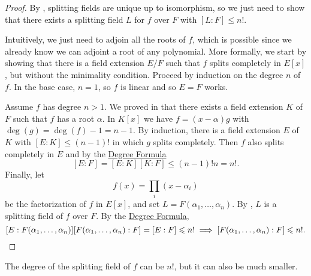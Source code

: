 \documentclass[12pt]{report}
\numberwithin{equation}{section}
\numberwithin{theorem}{chapter}
\theoremstyle{definition}
\newtheorem*{basic properties}{Basic Properties}
\newtheorem*{Important Remark}{Important Remark}
\begin{document}
\begin{proof} 
By , splitting fields are unique up to isomorphism, so we just need to show that there exists a splitting field $L$ for $f$ over $F$ with $[L:F]\leqslant n!$.

Intuitively, we just need to adjoin all the roots of $f$, which is possible since we already know we can adjoint a root of any polynomial. More formally, we start by showing that there is a field extension $E/F$ such that $f$ splits completely in $E[x]$, but without the minimality condition. Proceed by induction on the degree $n$ of $f$. In the base case, $n=1$, so $f$ is linear and so $E = F$ works.

Assume $f$ has degree $n>1$. We proved in  that there exists a field extension $K$ of $F$ such that $f$ has a root $\alpha$. 
In $K[x]$ we have $f= (x-\alpha) g$ with $\deg(g) = \deg(f)-1=n-1$. By induction, there is a field extension $E$ of $K$ with $[E:K] \leqslant (n-1)!$ in which $g$ splits completely. Then $f$ also splits completely in $E$ and by the \hyperref[deg formula]{Degree Formula}
$$[E:F]=[E:K][K:F] \leqslant (n-1)!n=n!.$$
Finally, let
$$f(x) = \prod_i (x - \alpha_i)$$ 
be the factorization of $f$ in $E[x]$, and set $L = F(\alpha_1, \dots, \alpha_n)$. By , $L$ is a splitting field of $f$ over $F$. By the \hyperref[deg formula]{Degree Formula},
$$[E:F(\alpha_1, \dots, \alpha_n)][F(\alpha_1, \dots, \alpha_n):F] = [E:F] \leqslant n! \implies [F(\alpha_1, \dots, \alpha_n):F] \leqslant n!.\qedhere$$
\end{proof}


The degree of the splitting field of $f$ can be $n!$, but it can also be much smaller.
\end{document}
